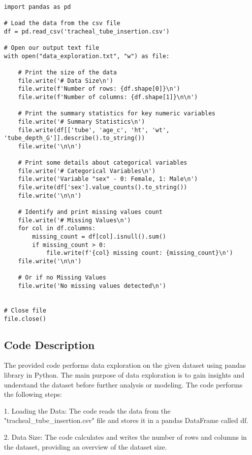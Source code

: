 \documentclass[11pt]{article}
\begin{document}
\begin{verbatim}

import pandas as pd

# Load the data from the csv file
df = pd.read_csv('tracheal_tube_insertion.csv')

# Open our output text file
with open("data_exploration.txt", "w") as file:

    # Print the size of the data
    file.write('# Data Size\n')
    file.write(f'Number of rows: {df.shape[0]}\n')
    file.write(f'Number of columns: {df.shape[1]}\n\n')

    # Print the summary statistics for key numeric variables
    file.write('# Summary Statistics\n')
    file.write(df[['tube', 'age_c', 'ht', 'wt', 'tube_depth_G']].describe().to_string())
    file.write('\n\n')

    # Print some details about categorical variables
    file.write('# Categorical Variables\n')
    file.write('Variable "sex" - 0: Female, 1: Male\n')
    file.write(df['sex'].value_counts().to_string())
    file.write('\n\n')

    # Identify and print missing values count
    file.write('# Missing Values\n')
    for col in df.columns:
        missing_count = df[col].isnull().sum()
        if missing_count > 0:
            file.write(f'{col} missing count: {missing_count}\n')
    file.write('\n\n')

    # Or if no Missing Values
    file.write('No missing values detected\n')


# Close file
file.close()

\end{verbatim}

\subsection{Code Description}

The provided code performs data exploration on the given dataset using pandas library in Python. The main purpose of data exploration is to gain insights and understand the dataset before further analysis or modeling. The code performs the following steps:

1. Loading the Data: 
   The code reads the data from the "tracheal\_tube\_insertion.csv" file and stores it in a pandas DataFrame called df.

2. Data Size:
   The code calculates and writes the number of rows and columns in the dataset, providing an overview of the dataset size.
\end{document}
